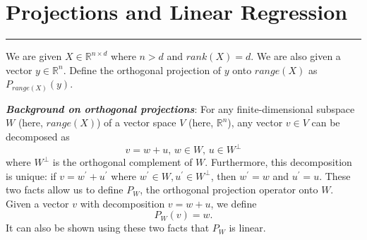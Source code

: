 \documentclass{article}
\begin{document}
\newpage
\section*{Projections and Linear Regression}
\hrule

We are given $X \in \mathbb{R}^{n \times d}$ where $n > d$ and $rank(X) = d$. We are also given a vector $y \in \mathbb{R}^{n}$. Define the orthogonal projection of $y$ onto $range(X) $ as $P_{range(X)}(y)$.

\textbf{\textit{Background on orthogonal projections}}: For any finite-dimensional subspace $W$ (here, $range(X)$) of a vector space $V$ (here, $\mathbb{R}^{n}$), any vector $v \in V$ can be decomposed as
    \begin{equation*}
        v = w + u, \, w \in W, \, u \in W^{\perp}
    \end{equation*}
where $W^{\perp}$ is the orthogonal complement of $W$. Furthermore, this decomposition is unique: if $v = w^{\prime} + u^{\prime}$ where $w^{\prime} \in W, u^{\prime} \in W^{\perp}$, then $w^{\prime} = w$ and $u^{\prime} = u$. These two facts allow us to define $P_{W}$, the orthogonal projection operator onto $W$. Given a vector $v$ with decomposition $v = w + u$, we define
    \begin{equation*}
        P_{W}(v) = w.
    \end{equation*}
It can also be shown using these two facts that $P_{W}$ is linear.
\end{document}
